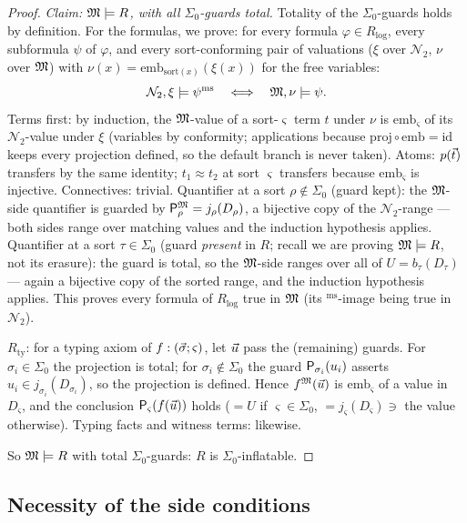 \begin{proof}
\emph{Claim: $\mathfrak{M} \models R$, with all $\Sigma_0$-guards total.}
Totality of the $\Sigma_0$-guards holds by definition.  For the
formulas, we prove: for every formula $\varphi \in
R_{\mathrm{log}}$, every subformula $\psi$ of $\varphi$, and every
sort-conforming pair of valuations ($\xi$ over $\mathcal{N}_2$,
$\nu$ over $\mathfrak{M}$) with $\nu(x) =
\mathrm{emb}_{\mathrm{sort}(x)}(\xi(x))$ for the free variables:
\[
  \mathcal{N}_2, \xi \models \psi^{\mathrm{ms}}
  \quad\Longleftrightarrow\quad
  \mathfrak{M}, \nu \models \psi .
\]
Terms first: by induction, the $\mathfrak{M}$-value of a sort-$\varsigma$
term $t$ under $\nu$ is $\mathrm{emb}_\varsigma$ of its
$\mathcal{N}_2$-value under $\xi$ (variables by conformity;
applications because $\mathrm{proj} \circ \mathrm{emb} =
\mathrm{id}$ keeps every projection defined, so the default branch
is never taken).  Atoms: $p(\vec{t})$ transfers by the same
identity; $t_1 \approx t_2$ at sort $\varsigma$ transfers because
$\mathrm{emb}_\varsigma$ is injective.  Connectives: trivial.
Quantifier at a sort $\rho \notin \Sigma_0$ (guard kept): the
$\mathfrak{M}$-side quantifier is guarded by $\mathsf{P}_{\rho}^{\mathfrak{M}} =
j_\rho(D_\rho)$, a bijective copy of the $\mathcal{N}_2$-range ---
both sides range over matching values and the induction hypothesis
applies.  Quantifier at a sort $\tau \in \Sigma_0$ (guard
\emph{present} in $R$; recall we are proving $\mathfrak{M} \models R$,
not its erasure): the guard is total, so the $\mathfrak{M}$-side ranges over
all of $U = b_\tau(D_\tau)$ --- again a bijective copy of the
sorted range, and the induction hypothesis applies.  This proves
every formula of $R_{\mathrm{log}}$ true in $\mathfrak{M}$ (its
$^{\mathrm{ms}}$-image being true in $\mathcal{N}_2$).

$R_{\mathrm{ty}}$: for a typing axiom of $f : (\vec{\sigma};
\varsigma)$, let $\vec{u}$ pass the (remaining) guards.  For
$\sigma_i \in \Sigma_0$ the projection is total; for $\sigma_i
\notin \Sigma_0$ the guard $\mathsf{P}_{\sigma_i}(u_i)$ asserts $u_i \in
j_{\sigma_i}(D_{\sigma_i})$, so the projection is defined.  Hence
$f^{\mathfrak{M}}(\vec{u})$ is $\mathrm{emb}_\varsigma$ of a value in
$D_\varsigma$, and the conclusion $\mathsf{P}_{\varsigma}(f(\vec{u}))$
holds ($= U$ if $\varsigma \in \Sigma_0$, $=
j_\varsigma(D_\varsigma) \ni$ the value otherwise).  Typing facts
and witness terms: likewise.

So $\mathfrak{M} \models R$ with total $\Sigma_0$-guards: $R$ is
$\Sigma_0$-inflatable.
\end{proof}

\subsection{Necessity of the side conditions}

